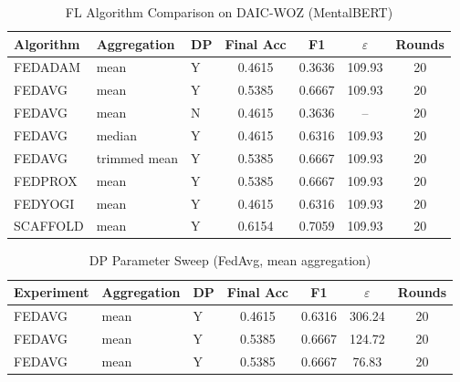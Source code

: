 \begin{table}[htbp]
\centering
\caption{FL Algorithm Comparison on DAIC-WOZ (MentalBERT)}
\begin{tabular}{lllcccc}
\toprule
Algorithm & Aggregation & DP & Final Acc & F1 & $\varepsilon$ & Rounds \\
\midrule
FEDADAM & mean & Y & 0.4615 & 0.3636 & 109.93 & 20 \\
FEDAVG & mean & Y & 0.5385 & 0.6667 & 109.93 & 20 \\
FEDAVG & mean & N & 0.4615 & 0.3636 & -- & 20 \\
FEDAVG & median & Y & 0.4615 & 0.6316 & 109.93 & 20 \\
FEDAVG & trimmed mean & Y & 0.5385 & 0.6667 & 109.93 & 20 \\
FEDPROX & mean & Y & 0.5385 & 0.6667 & 109.93 & 20 \\
FEDYOGI & mean & Y & 0.4615 & 0.6316 & 109.93 & 20 \\
SCAFFOLD & mean & Y & 0.6154 & 0.7059 & 109.93 & 20 \\
\bottomrule
\end{tabular}
\end{table}

\begin{table}[htbp]
\centering
\caption{DP Parameter Sweep (FedAvg, mean aggregation)}
\begin{tabular}{lllcccc}
\toprule
Experiment & Aggregation & DP & Final Acc & F1 & $\varepsilon$ & Rounds \\
\midrule
FEDAVG & mean & Y & 0.4615 & 0.6316 & 306.24 & 20 \\
FEDAVG & mean & Y & 0.5385 & 0.6667 & 124.72 & 20 \\
FEDAVG & mean & Y & 0.5385 & 0.6667 & 76.83 & 20 \\
\bottomrule
\end{tabular}
\end{table}